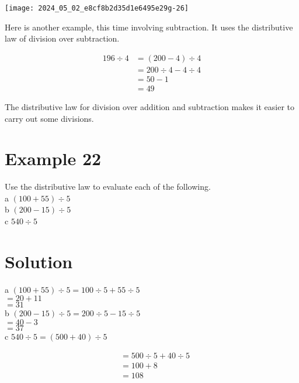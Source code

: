 \documentclass[10pt]{article}
\begin{document}
\begin{center}
\texttt{[image: 2024\_05\_02\_e8cf8b2d35d1e6495e29g-26]}
\end{center}

Here is another example, this time involving subtraction. It uses the distributive law of division over subtraction.

\[
\begin{aligned}
196 \div 4 & =(200-4) \div 4 \\
& =200 \div 4-4 \div 4 \\
& =50-1 \\
& =49
\end{aligned}
\]

The distributive law for division over addition and subtraction makes it easier to carry out some divisions.

\section*{Example 22}
Use the distributive law to evaluate each of the following.\\
a \((100+55) \div 5\)\\
b \((200-15) \div 5\)\\
c \(540 \div 5\)

\section*{Solution}
a \((100+55) \div 5=100 \div 5+55 \div 5\)\\
\(=20+11\)\\
\(=31\)\\
b \((200-15) \div 5=200 \div 5-15 \div 5\)\\
\(=40-3\)\\
\(=37\)\\
c \(540 \div 5=(500+40) \div 5\)

\[
\begin{aligned}
& =500 \div 5+40 \div 5 \\
& =100+8 \\
& =108
\end{aligned}
\]
\end{document}
